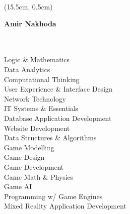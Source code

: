 \documentclass[a4paper,10pt]{article}
\begin{document}
  \begin{textblock*}{5cm}(15.5cm, 0.5cm)
    \small {}
  \end{textblock*}

  \begin{center}
    \Huge \textbf{Amir Nakhoda}\\
    \vspace{0.2cm}
    \normalsize
    \makebox[\linewidth]{\rule{\paperwidth}{0.6pt}}
  \end{center}
    
  \setlength{\columnsep}{0.5cm}
  \begin{paracol}{2}
    \begin{leftcolumn}
      \Large\noindent{}
      \vspace{0.15cm}\\
      \normalsize{}\\
      \small\lato
      Logic \& Mathematics\\
      Data Analytics\\
      Computational Thinking\\
      User Experience \& Interface Design\\
      Network Technology\\
      IT Systems \& Essentials\\
      Database Application Development\\
      Website Development\\
      Data Structures \& Algorithms\\
      Game Modelling\\
      Game Design\\
      Game Development\\
      Game Math \& Physics\\
      Game AI\\
      Programming w/ Game Engines\\
      Mixed Reality Application Development

      \vspace{0.35cm}

      \Large\noindent{}
      \vspace{0.15cm}\\
      \normalsize
      \href{https://www.linkedin.com/in/amir-nakhoda/}{}\\
      \href{https://github.com/NakhodaAmir}{}


\end{leftcolumn}
\end{paracol}
\end{document}
